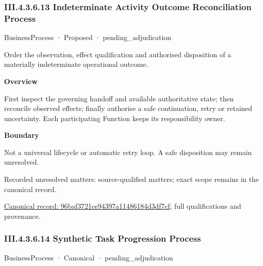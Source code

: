 \subsubsection*{III.4.3.6.13 Indeterminate Activity Outcome Reconciliation Process}
\label{navigation:III.4.3.6.13}

\label{element:96baf3721ce94397a11486184d3df7cf}
{\small BusinessProcess · Proposed · pending\_adjudication}\par

Order the observation, effect qualification and authorised disposition of a materially indeterminate operational outcome.



\textbf{Overview}



First inspect the governing handoff and available authoritative state; then reconcile observed effects; finally authorise a safe continuation, retry or retained uncertainty. Each participating Function keeps its responsibility owner.



\textbf{Boundary}



Not a universal lifecycle or automatic retry loop. A safe disposition may remain unresolved.


{\small Recorded unresolved matters: source-qualified matters; exact scope remains in the canonical record.}\par
{\footnotesize \href{../../../../../../../../continuum/business/business-process/96baf3721ce94397a11486184d3df7cf.md}{Canonical record: 96baf3721ce94397a11486184d3df7cf}; full qualifications and provenance.}\par
\subsubsection*{III.4.3.6.14 Synthetic Task Progression Process}
\label{navigation:III.4.3.6.14}

\label{element:618acdb38fc74952ab360fdde4f7d865}
{\small BusinessProcess · Canonical · pending\_adjudication}\par

